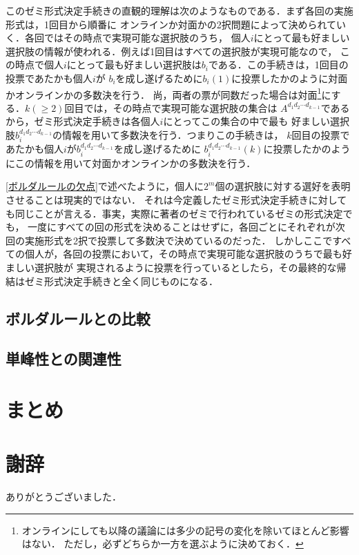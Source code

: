 \documentclass[dvipdfmx]{jsarticle}
\begin{document}
このゼミ形式決定手続きの直観的理解は次のようなものである．まず各回の実施形式は，1回目から順番に
オンラインか対面かの2択問題によって決められていく．各回ではその時点で実現可能な選択肢のうち，
個人$i$にとって最も好ましい選択肢の情報が使われる．例えば1回目はすべての選択肢が実現可能なので，
この時点で個人$i$にとって最も好ましい選択肢は$b_i$である．この手続きは，1回目の投票であたかも個人$i$が
$b_i$を成し遂げるために$b_{i}(1)$に投票したかのように対面かオンラインかの多数決を行う．
尚，両者の票が同数だった場合は対面\footnote{オンラインにしても以降の議論には多少の記号の変化を除いてほとんど影響はない．
ただし，必ずどちらか一方を選ぶように決めておく．}にする．$k(\geq 2)$回目では，その時点で実現可能な選択肢の集合は
$A^{d_{1}d_{2}\cdots d_{k-1}}$であるから，ゼミ形式決定手続きは各個人$i$にとってこの集合の中で最も
好ましい選択肢$b_i^{d_{1}d_{2}\cdots d_{k-1}}$の情報を用いて多数決を行う．つまりこの手続きは，
$k$回目の投票であたかも個人$i$が$b_i^{d_{1}d_{2}\cdots d_{k-1}}$を成し遂げるために
$b_i^{d_{1}d_{2}\cdots d_{k-1}}(k)$に投票したかのようにこの情報を用いて対面かオンラインかの多数決を行う．

\ref{ボルダルールの欠点}で述べたように，個人に$2^m$個の選択肢に対する選好を表明させることは現実的ではない．
それは今定義したゼミ形式決定手続きに対しても同じことが言える．事実，実際に著者のゼミで行われているゼミの形式決定でも，
一度にすべての回の形式を決めることはせずに，各回ごとにそれぞれが次回の実施形式を2択で投票して多数決で決めているのだった．
しかしここですべての個人が，各回の投票において，その時点で実現可能な選択肢のうちで最も好ましい選択肢が
実現されるように投票を行っているとしたら，その最終的な帰結はゼミ形式決定手続きと全く同じものになる．








\subsection{ボルダルールとの比較}
\subsection{単峰性との関連性}

\section{まとめ}

\section*{謝辞}
ありがとうございました．
\end{document}
